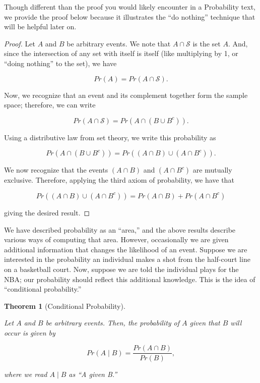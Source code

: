 \documentclass[
  letterpaper,
  DIV=11,
  numbers=noendperiod]{scrreprt}
\theoremstyle{definition}
\theoremstyle{plain}
\newtheorem{theorem}{Theorem}[chapter]
\theoremstyle{definition}
\theoremstyle{remark}
\begin{document}
Though different than the proof you would likely encounter in a
Probability text, we provide the proof below because it illustrates the
``do nothing'' technique that will be helpful later on.

\begin{proof}

Let \(A\) and \(B\) be arbitrary events. We note that
\(A \cap \mathcal{S}\) is the set \(A\). And, since the intersection of
any set with itself is itself (like multiplying by 1, or ``doing
nothing'' to the set), we have

\[Pr(A) = Pr(A \cap \mathcal{S}).\]

Now, we recognize that an event and its complement together form the
sample space; therefore, we can write

\[Pr(A \cap \mathcal{S}) = Pr\left(A \cap \left(B \cup B^c\right)\right).\]

Using a distributive law from set theory, we write this probability as

\[Pr\left(A \cap \left(B \cup B^c\right)\right) = Pr\left((A \cap B) \cup \left(A \cap B^c\right)\right).\]

We now recognize that the events \((A \cap B)\) and
\(\left(A \cap B^c\right)\) are mutually exclusive. Therefore, applying
the third axiom of probability, we have that

\[Pr\left((A \cap B) \cup \left(A \cap B^c\right)\right) = Pr(A \cap B) + Pr\left(A \cap B^c\right)\]

giving the desired result.

\end{proof}

We have described probability as an ``area,'' and the above results
describe various ways of computing that area. However, occasionally we
are given additional information that changes the likelihood of an
event. Suppose we are interested in the probability an individual makes
a shot from the half-court line on a basketball court. Now, suppose we
are told the individual plays for the NBA; our probability should
reflect this additional knowledge. This is the idea of ``conditional
probability.''

\begin{theorem}[Conditional
Probability]\protect\hypertarget{thm-conditional-probability}{}\label{thm-conditional-probability}

Let \(A\) and \(B\) be arbitrary events. Then, the probability of \(A\)
given that \(B\) will occur is given by

\[Pr(A \mid B) = \frac{Pr(A \cap B)}{Pr(B)},\]

where we read \(A \mid B\) as ``A given B.''

\end{theorem}
\end{document}
